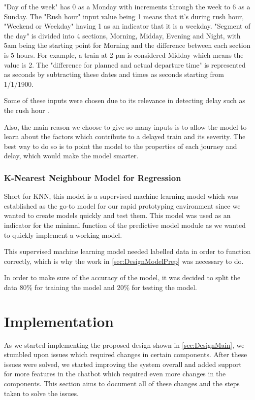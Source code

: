 \documentclass[11pt]{article}
\begin{document}
        "Day of the week" has 0 as a Monday with increments through the week to 6 as a Sunday. The "Rush hour" input value being 1 means that it's during rush hour, "Weekend or Weekday" having 1 as an indicator that it is a weekday. "Segment of the day" is divided into 4 sections, Morning, Midday, Evening and Night,  with 5am being the starting point for Morning and the difference between each section is 5 hours. For example, a train at 2 pm is considered Midday which means the value is 2. The "difference for planned and actual departure time" is represented as seconds by subtracting these dates and times as seconds starting from 1/1/1900.
    
        Some of these inputs were chosen due to its relevance in detecting delay such as the rush hour \citep{NetworkRail}.
    
        Also, the main reason we choose to give so many inputs is to allow the model to learn about the factors which contribute to a delayed train and its severity. The best way to do so is to point the model to the properties of each journey and delay, which would make the model smarter.

        \subsubsection{K-Nearest Neighbour Model for Regression}
        Short for KNN, this model is a supervised machine learning model which was established as the go-to model for our rapid prototyping environment since we wanted to create models quickly and test them. This model was used as an indicator for the minimal function of the predictive model module as we wanted to quickly implement a working model. 
    
        This supervised machine learning model needed labelled data in order to function correctly, which is why the work in \cref{sec:DesignModelPrep} was necessary to do.
    
        In order to make sure of the accuracy of the model, it was decided to split the data 80\% for training the model and 20\% for testing the model. 



\section{Implementation}
As we started implementing the proposed design shown in \cref{sec:DesignMain}, we stumbled upon issues which required changes in certain components. After these issues were solved, we started improving the system overall and added support for more features in the chatbot which required even more changes in the components. This section aims to document all of these changes and the steps taken to solve the issues.
\end{document}
